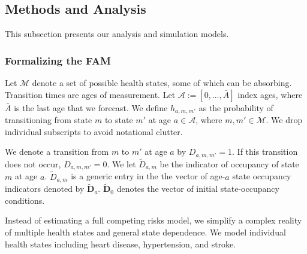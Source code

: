 \subsection{Methods and Analysis}

This subsection presents our analysis and simulation models.

\subsubsection{Formalizing the FAM}
\label{section:transition_models}

Let $\mathcal{M}$ denote a set of possible health states, some of which can be absorbing. Transition times are ages of measurement. Let $\mathcal{A}:= [ 0, \ldots, \bar{A}]$ index ages, where $\bar{A}$ is the last age that we forecast. We define $h_{a,m,m'}$ as the probability of transitioning from state $m$ to state $m'$ at age $a \in \mathcal{A}$, where $m, m' \in \mathcal{M}$. We drop individual subscripts to avoid notational clutter.

We denote a transition from $m$ to $m'$ at age $a$ by $D_{a,m,m'} = 1$. If this transition does not occur,  $D_{a,m,m'} = 0$. We let $\tilde{D}_{a,m}$ be the indicator of occupancy of state $m$ at age $a$. $\tilde{D}_{a,m}$ is a generic entry in the the vector of age-$a$ state occupancy indicators denoted by $\tilde{\bm{D}}_a$. $\tilde{\bm{D}}_0$ denotes the vector of initial state-occupancy conditions.

Instead of estimating a full competing risks model, we simplify a complex reality of multiple health states and general state dependence. We model individual health states including heart disease, hypertension, and stroke. 

